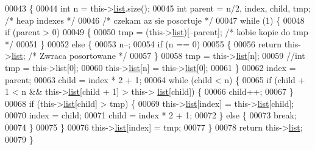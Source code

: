 \begin{DoxyCode}
00043         \{
00044                 \textcolor{keywordtype}{int} n = this->\hyperlink{class_heap_sorter_ae5061b641a597893a2e7f747c9cc15f2}{list}.size();
00045             \textcolor{keywordtype}{int} parent = n/2, index, child, tmp; \textcolor{comment}{/* heap indexes */}
00046             \textcolor{comment}{/* czekam az sie posortuje */}
00047             \textcolor{keywordflow}{while} (1) \{
00048                 \textcolor{keywordflow}{if} (parent > 0)
00049                 \{
00050                     tmp = (this->\hyperlink{class_heap_sorter_ae5061b641a597893a2e7f747c9cc15f2}{list})[--parent];  \textcolor{comment}{/* kobie kopie do tmp */}
00051                 \}
00052                 \textcolor{keywordflow}{else} \{
00053                     n--;
00054                     \textcolor{keywordflow}{if} (n == 0)
00055                     \{
00056                         \textcolor{keywordflow}{return} this->\hyperlink{class_heap_sorter_ae5061b641a597893a2e7f747c9cc15f2}{list}; \textcolor{comment}{/* Zwraca posortowane */}
00057                     \}
00058                     tmp = this->\hyperlink{class_heap_sorter_ae5061b641a597893a2e7f747c9cc15f2}{list}[n];
00059                     \textcolor{comment}{//int tmp = this->list[0];}
00060                     this->\hyperlink{class_heap_sorter_ae5061b641a597893a2e7f747c9cc15f2}{list}[n] = this->\hyperlink{class_heap_sorter_ae5061b641a597893a2e7f747c9cc15f2}{list}[0];
00061                 \}
00062                 index = parent;
00063                 child = index * 2 + 1;
00064                 \textcolor{keywordflow}{while} (child < n) \{
00065                     \textcolor{keywordflow}{if} (child + 1 < n  &&  this->\hyperlink{class_heap_sorter_ae5061b641a597893a2e7f747c9cc15f2}{list}[child + 1] > this->
      \hyperlink{class_heap_sorter_ae5061b641a597893a2e7f747c9cc15f2}{list}[child]) \{
00066                         child++;
00067                     \}
00068                     \textcolor{keywordflow}{if} (this->\hyperlink{class_heap_sorter_ae5061b641a597893a2e7f747c9cc15f2}{list}[child] > tmp) \{
00069                         this->\hyperlink{class_heap_sorter_ae5061b641a597893a2e7f747c9cc15f2}{list}[index] = this->\hyperlink{class_heap_sorter_ae5061b641a597893a2e7f747c9cc15f2}{list}[child];
00070                         index = child;
00071                         child = index * 2 + 1;
00072                     \} \textcolor{keywordflow}{else} \{
00073                         \textcolor{keywordflow}{break};
00074                     \}
00075                 \}
00076                 this->\hyperlink{class_heap_sorter_ae5061b641a597893a2e7f747c9cc15f2}{list}[index] = tmp;
00077             \}
00078             \textcolor{keywordflow}{return} this->\hyperlink{class_heap_sorter_ae5061b641a597893a2e7f747c9cc15f2}{list};
00079         \}
\end{DoxyCode}


